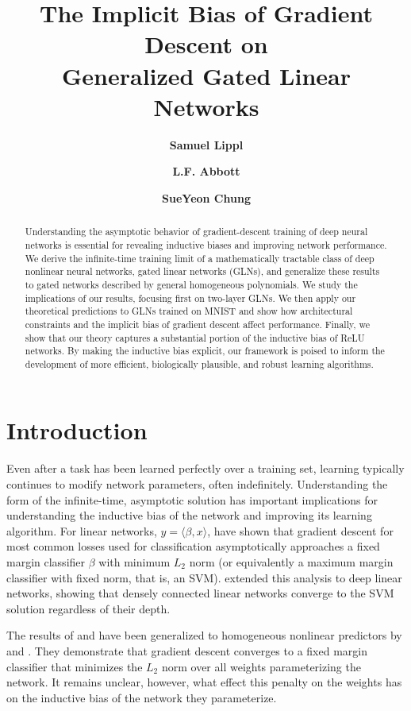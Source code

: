 \documentclass{article}
\author[1]{\textbf{Samuel Lippl}}
\author[1]{\textbf{L.F. Abbott}}
\author[1,2]{\textbf{SueYeon Chung}}
\affil[1]{Department of Neuroscience, Zuckerman Mind Brain Behavior Institute, Columbia University, New York, NY}
\affil[2]{Center for Computational Neuroscience, Flatiron Institute, New York, NY}
\affil[ ]{\texttt{\{sl4742,lfabbott\}@columbia.edu,schung@flatironinstitute.org}}
\title{The Implicit Bias of Gradient Descent on\\Generalized Gated Linear Networks}
\theoremstyle{plain}
\theoremstyle{definition}
\theoremstyle{remark}
\begin{document}
\maketitle

\begin{abstract}
	Understanding the asymptotic behavior of gradient-descent training of deep neural networks is essential for revealing inductive biases and improving network performance.
We derive the infinite-time training limit of a mathematically tractable class of deep nonlinear neural networks, gated linear networks (GLNs), and generalize these results to gated networks described by general homogeneous polynomials.
We study the implications of our results, focusing first on two-layer GLNs.
We then apply our theoretical predictions to GLNs trained on MNIST and show how architectural constraints and the implicit bias of gradient descent affect performance.
Finally, we show that our theory captures a substantial portion of the inductive bias of ReLU networks.
By making the inductive bias explicit, our framework is poised to inform the development of more efficient, biologically plausible, and robust learning algorithms.
\end{abstract}

\section{Introduction}

Even after a task has been learned perfectly over a training set, learning typically continues to modify network parameters, often indefinitely.
Understanding the form of the infinite-time, asymptotic solution has important implications for understanding the inductive bias of the network and improving its learning algorithm.
For linear networks, $y=\langle\beta,x\rangle$, \citet{soudry_implicit_2018} have shown that gradient descent for most common losses used for classification asymptotically approaches a fixed margin classifier $\beta$ with minimum $L_2$ norm (or equivalently a maximum margin classifier with fixed norm, that is, an SVM).
\citet{gunasekar_implicit_2018} extended this analysis to deep linear networks, showing that densely connected linear networks converge to the SVM solution regardless of their depth.

The results of \citet{soudry_implicit_2018} and \citet{gunasekar_implicit_2018} have been generalized to homogeneous nonlinear predictors by \citet{nacson_lexicographic_2019} and \citet{lyu_gradient_2020}.
They demonstrate that gradient descent converges to a fixed margin classifier that minimizes the $L_2$ norm over all weights parameterizing the network.
It remains unclear, however, what effect this penalty on the weights has on the inductive bias of the network they parameterize.
\end{document}
